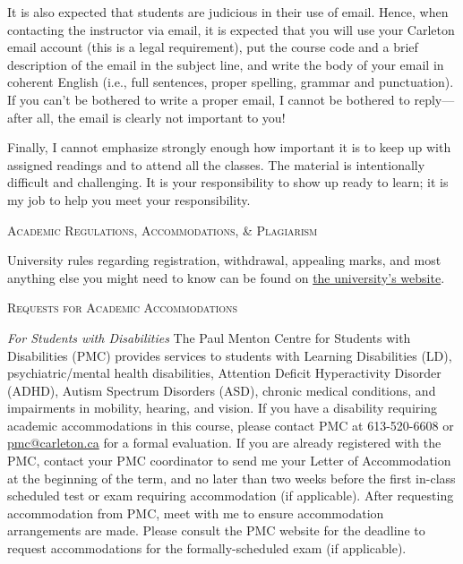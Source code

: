 \documentclass[12pt]{article}
\begin{document}
It is also expected that students are judicious in their use of email. Hence, when contacting the instructor via email, it is expected that you will use your Carleton email account (this is a legal requirement), put the course code and a brief description of the email in the subject line, and write the body of your email in coherent English (i.e., full sentences, proper spelling, grammar and punctuation). If you can't be bothered to write a proper email, I cannot be bothered to reply---after all, the email is clearly not important to you!

Finally, I cannot emphasize strongly enough how important it is to keep up with assigned readings and to attend all the classes. The material is intentionally difficult and challenging. It is your responsibility to show up ready to learn; it is my job to help you meet your responsibility.

{\Large \textsc{Academic Regulations, Accommodations, \& Plagiarism}}

University rules regarding registration, withdrawal, appealing marks, and most anything else you might need to know can be found on \href{http://www.carleton.ca/cu0708uc/regulations/acadregsuniv.html}{the university's website}.

{\large \textsc{Requests for Academic Accommodations}}

\textit{For Students with Disabilities} The Paul Menton Centre for Students with Disabilities (PMC) provides services to students with Learning Disabilities (LD), psychiatric/mental health disabilities, Attention Deficit Hyperactivity Disorder (ADHD), Autism Spectrum Disorders (ASD), chronic medical conditions, and impairments in mobility, hearing, and vision. If you have a disability requiring academic accommodations in this course, please contact PMC at 613-520-6608 or \href{mailto:pmc@carleton.ca}{pmc@carleton.ca} for a formal evaluation. If you are already registered with the PMC, contact your PMC coordinator to send me your Letter of Accommodation at the beginning of the term, and no later than two weeks before the first in-class scheduled test or exam requiring accommodation (if applicable). After requesting accommodation from PMC, meet with me to ensure accommodation arrangements are made. Please consult the PMC website for the deadline to request accommodations for the formally-scheduled exam (if applicable).
\end{document}
